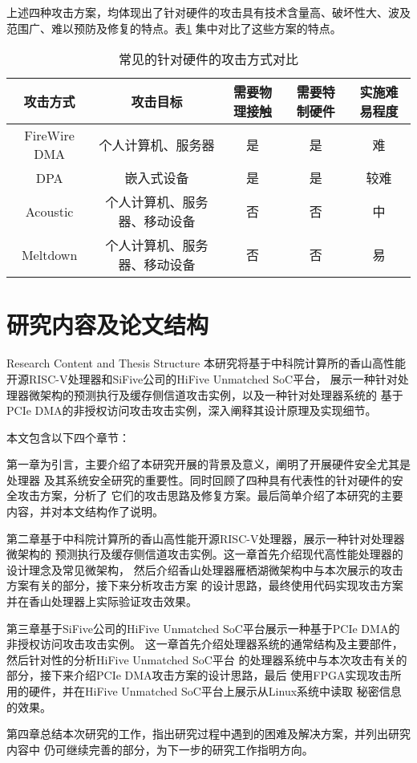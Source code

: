 上述四种攻击方案，均体现出了针对硬件的攻击具有技术含量高、破坏性大、波及范围广、难以预防及修复的特点。表\ref{tab:hw-attack-comp}
集中对比了这些方案的特点。

\begin{table}[!ht]
	\centering
\begin{threeparttable}[b]
\caption{常见的针对硬件的攻击方式对比}
\begin{tabular}{ccccc}
	\toprule
	攻击方式 & 攻击目标 & 需要物理接触 & 需要特制硬件 & 实施难易程度 \\
	\midrule
	FireWire DMA\cite{becher2005firewire} & 个人计算机、服务器 & 是 & 是 & 难 \\
	DPA\cite{kocher1999differential} & 嵌入式设备 & 是 & 是 & 较难 \\
	Acoustic\cite{acoustic} & 个人计算机、服务器、移动设备 & 否 & 否 & 中 \\
	Meltdown\cite{lipp_meltdown_2018} & 个人计算机、服务器、移动设备 & 否 & 否 & 易 \\
	\bottomrule
\end{tabular}
\label{tab:hw-attack-comp}
\end{threeparttable}
\end{table}


\section{研究内容及论文结构}{Research Content and Thesis Structure}
本研究将基于中科院计算所的香山高性能开源RISC-V处理器和SiFive公司的HiFive Unmatched SoC平台，
展示一种针对处理器微架构的预测执行及缓存侧信道攻击实例，以及一种针对处理器系统的
基于PCIe DMA的非授权访问攻击攻击实例，深入阐释其设计原理及实现细节。

本文包含以下四个章节：

第一章为引言，主要介绍了本研究开展的背景及意义，阐明了开展硬件安全尤其是处理器
及其系统安全研究的重要性。同时回顾了四种具有代表性的针对硬件的安全攻击方案，分析了
它们的攻击思路及修复方案。最后简单介绍了本研究的主要内容，并对本文结构作了说明。

第二章基于中科院计算所的香山高性能开源RISC-V处理器，展示一种针对处理器微架构的
预测执行及缓存侧信道攻击实例。这一章首先介绍现代高性能处理器的设计理念及常见微架构，
然后介绍香山处理器雁栖湖微架构中与本次展示的攻击方案有关的部分，接下来分析攻击方案
的设计思路，最终使用代码实现攻击方案并在香山处理器上实际验证攻击效果。

第三章基于SiFive公司的HiFive Unmatched SoC平台展示一种基于PCIe DMA的非授权访问攻击攻击实例。
这一章首先介绍处理器系统的通常结构及主要部件，然后针对性的分析HiFive Unmatched SoC平台
的处理器系统中与本次攻击有关的部分，接下来介绍PCIe DMA攻击方案的设计思路，最后
使用FPGA实现攻击所用的硬件，并在HiFive Unmatched SoC平台上展示从Linux系统中读取
秘密信息的效果。

第四章总结本次研究的工作，指出研究过程中遇到的困难及解决方案，并列出研究内容中
仍可继续完善的部分，为下一步的研究工作指明方向。

\newpage
